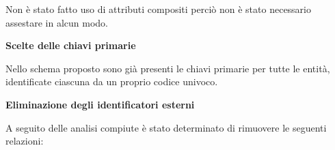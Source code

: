 \textsf{\small Non è stato fatto uso di attributi compositi perciò non è stato necessario assestare in alcun modo.}\break %

\textbf{Scelte delle chiavi primarie}

\textsf{\small Nello schema proposto sono già presenti le chiavi primarie per tutte le entità, identificate ciascuna da un proprio codice univoco.}\break

\textbf{Eliminazione degli identificatori esterni}

\textsf{\small A seguito delle analisi compiute è stato determinato di rimuovere le seguenti relazioni:}\\ %


\begin{itemize} 
	
	

\end{itemize}
